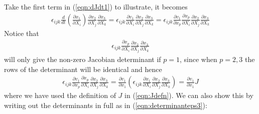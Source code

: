 Take the first term in (\ref{eqn:dJdt1}) to illustrate, it becomes
\begin{align}
\epsilon_{ijk} \frac{d}{dt}\left(\frac{\partial x_1}{\partial X_i}\right)\frac{\partial x_2}{\partial X_j}\frac{\partial x_3}{\partial X_k} = \epsilon_{ijk} \frac{\partial v_1}{\partial X_i}\frac{\partial x_2}{\partial X_j}\frac{\partial x_3}{\partial X_k} = \epsilon_{ijk} \frac{\partial v_1}{\partial x_p}\frac{\partial x_p}{\partial X_i}\frac{\partial x_2}{\partial X_j}\frac{\partial x_3}{\partial X_k} 
\end{align}
Notice that
\begin{align*}
\epsilon_{ijk} \frac{\partial x_p}{\partial X_i}\frac{\partial x_2}{\partial X_j}\frac{\partial x_3}{\partial X_k}
\end{align*}
will only give the non-zero Jacobian determinant if $p=1$, since when $p=2,3$ the rows of the determinant will be identical and hence
\begin{align}
\epsilon_{ijk} \frac{\partial v_1}{\partial x_p}\frac{\partial x_p}{\partial X_i}\frac{\partial x_2}{\partial X_j}\frac{\partial x_3}{\partial X_k} =  \frac{\partial v_1}{\partial x_1}\left(\epsilon_{ijk}\frac{\partial x_1}{\partial X_i}\frac{\partial x_2}{\partial X_j}\frac{\partial x_3}{\partial X_k}\right) = \frac{\partial v_1}{\partial x_1}J
\end{align}
where we have used the definition of $J$ in (\ref{eqn:Jdefn}). We can also show this by writing out the determinants in full as in (\ref{eqn:determinanteps3}):

